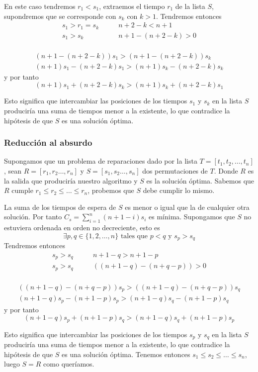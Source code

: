 \documentclass[a4]{article}
\begin{document}
En este caso tendremos $r_1 < s_1$, extraemos el
tiempo $r_1$ de la lista $S$, supondremos que se corresponde con $s_k$
con $k > 1$. Tendremos entonces
\begin{align*}
  s_1 > r_1 = s_k& \qquad n+2-k < n+1 \\
  s_1 > s_k& \qquad n+1 - (n+2-k) > 0 \\
\end{align*}

\vspace{-15mm}

\begin{align*}    
  (n+1-(n+2-k))s_1 > (n+1-(n+2-k))s_k \\
  (n+1)s_1 - (n+2-k)s_1 > (n+1)s_k - (n+2-k)s_k
\end{align*}
y por tanto
\[(n+1)s_1 + (n+2-k)s_k > (n+1)s_k + (n+2-k)s_1\]

Esto significa que intercambiar las posiciones de los tiempos $s_1$ y
$s_k$ en la lista $S$ produciría una suma de tiempos menor a la
existente, lo que contradice la hipótesis de que $S$ es una solución
óptima.

\hfill\qedsymbol

\vspace{-5mm}

\subsubsection{Reducción al absurdo}

Supongamos que un problema de reparaciones dado por la lista
$T=[t_1,t_2,\ldots,t_n]$, sean $R=[r_1,r_2\ldots,r_n]$ y
$S=[s_1,s_2\ldots,s_n]$ dos permutaciones de $T$. Donde $R$ es la
salida que produciría nuestro algoritmo y $S$ es la solución óptima.
Sabemos que $R$ cumple $r_1 \leq r_2 \leq \ldots \leq r_n$, probemos
que $S$ debe cumplir lo mismo.

La suma de los tiempos de espera de $S$ es menor o igual que la de
cualquier otra solución. Por tanto \(C_s = \sum_{i=1}^n (n+1-i)s_i\)
es mínima. Supongamos que $S$ no estuviera ordenada en orden no
decreciente, esto es
\[\exists p,q \in \{1,2,\ldots,n\} \mbox{ tales que } p<q \mbox{ y } s_p
  > s_q\]
Tendremos entonces
\begin{align*}
  s_p > s_q& \qquad n+1-q > n+1-p\\
  s_p > s_q& \qquad ((n+1-q) - (n+q-p)) > 0 \\
\end{align*}

\vspace{-15mm}

\begin{align*}    
  ((n+1-q) - (n+q-p))s_p > ((n+1-q) - (n+q-p))s_q \\
  (n+1-q)s_p - (n+1-p)s_p > (n+1-q)s_q - (n+1-p)s_q
\end{align*}
y por tanto
\[(n+1-q)s_p + (n+1-p)s_q > (n+1-q)s_q + (n+1-p)s_p\]

Esto significa que intercambiar las posiciones de los tiempos $s_p$ y
$s_q$ en la lista $S$ produciría una suma de tiempos menor a la
existente, lo que contradice la hipótesis de que $S$ es una solución
óptima. Tenemos entonces $s_1 \leq s_2 \leq \ldots \leq s_n$, luego
$S=R$ como queríamos.

\hfill\qedsymbol
\end{document}

